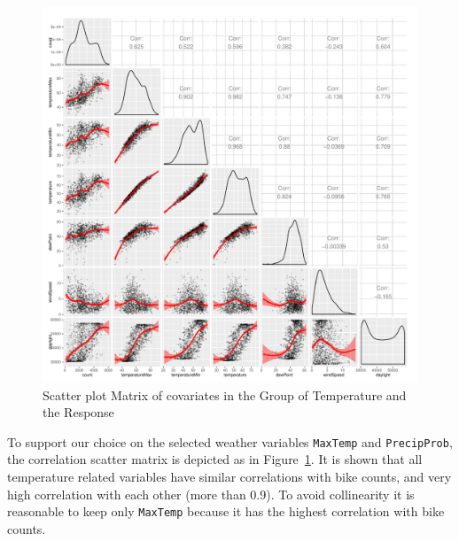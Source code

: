 \documentclass [11pt, proquest] {uwthesis}[2015/03/03]
\begin{document}
\begin{figure}
  \includegraphics[width=1\textwidth]{figures/matrix2}
  \caption{Scatter plot Matrix of covariates in the Group of Temperature and the Response}
  \label{fig:temp_corr}
\end{figure}

To support our choice on the selected weather variables \texttt{MaxTemp} and \texttt{PrecipProb}, the correlation scatter matrix is depicted as in Figure~\ref{fig:temp_corr}. It is shown that all temperature related variables have similar correlations with bike counts, and very high correlation with each other (more than 0.9). To avoid collinearity it is reasonable to keep only \texttt{MaxTemp} because it has the highest correlation with bike counts.  
\end{document}
